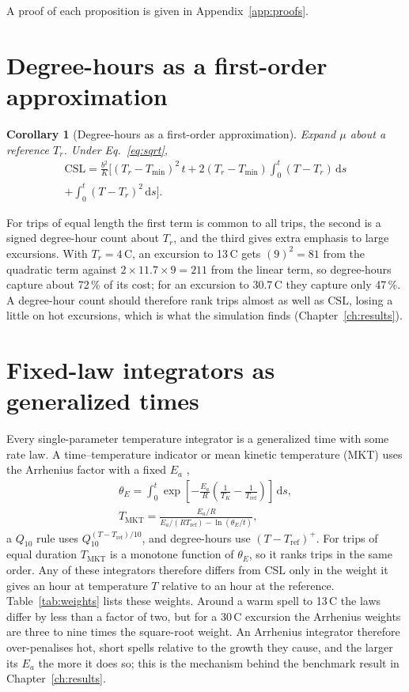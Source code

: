 \documentclass[11pt,a4paper,twoside,openany]{book}
\newcommand{\CSL}{\mathrm{CSL}}
\newcommand{\dd}{\,\mathrm{d}}
\newcommand{\degC}{\,\textdegree C}
\theoremstyle{plain}\newtheorem{proposition}{Proposition}\newtheorem{corollary}{Corollary}
\theoremstyle{definition}\newtheorem{definition}{Definition}[chapter]
\begin{document}
A proof of each proposition is given in Appendix~\ref{app:proofs}.

\section{Degree-hours as a first-order approximation}
\begin{corollary}[Degree-hours as a first-order approximation]\label{cor:dh}
Expand $\mu$ about a reference $T_r$. Under Eq.~\eqref{eq:sqrt},
\begin{multline}\label{eq:dh}
\CSL=\frac{b^2}{K}\Big[(T_r-T_{\min})^2\,t+2(T_r-T_{\min})\!\int_0^t\!(T-T_r)\dd s\\+\int_0^t(T-T_r)^2\dd s\Big].
\end{multline}
\end{corollary}
For trips of equal length the first term is common to all trips, the second is a signed degree-hour count about $T_r$, and the third gives extra emphasis to large excursions. With $T_r=4$\degC, an excursion to 13\degC{} gets $(9)^2=81$ from the quadratic term against $2\times11.7\times9=211$ from the linear term, so degree-hours capture about 72\,\% of its cost; for an excursion to 30.7\degC{} they capture only 47\,\%. A degree-hour count should therefore rank trips almost as well as $\CSL$, losing a little on hot excursions, which is what the simulation finds (Chapter~\ref{ch:results}).


\section{Fixed-law integrators as generalized times}\label{sec:mkt}
Every single-parameter temperature integrator is a generalized time with some rate law. A time--temperature indicator or mean kinetic temperature (MKT) uses the Arrhenius factor with a fixed $E_a$ \cite{taoukis1989,kim2020},
\begin{gather}
\theta_E=\int_0^t\exp\!\left[-\frac{E_a}{R}\left(\frac{1}{T_K}-\frac{1}{T_{\mathrm{ref}}}\right)\right]\dd s,\label{eq:mkt}\\
T_{\mathrm{MKT}}=\frac{E_a/R}{E_a/(RT_{\mathrm{ref}})-\ln(\theta_E/t)},\nonumber
\end{gather}
a $Q_{10}$ rule uses $Q_{10}^{(T-T_{\mathrm{ref}})/10}$, and degree-hours use $(T-T_{\mathrm{ref}})^+$. For trips of equal duration $T_{\mathrm{MKT}}$ is a monotone function of $\theta_E$, so it ranks trips in the same order. Any of these integrators therefore differs from $\CSL$ only in the weight it gives an hour at temperature $T$ relative to an hour at the reference. Table~\ref{tab:weights} lists these weights. Around a warm spell to 13\degC{} the laws differ by less than a factor of two, but for a 30\degC{} excursion the Arrhenius weights are three to nine times the square-root weight. An Arrhenius integrator therefore over-penalises hot, short spells relative to the growth they cause, and the larger its $E_a$ the more it does so; this is the mechanism behind the benchmark result in Chapter~\ref{ch:results}.
\end{document}
